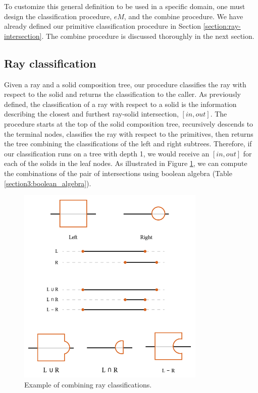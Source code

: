 \documentclass[a4paper,11pt,oneside]{article}
\begin{document}
To customize this general definition to be used in a specific domain, one must design the classification procedure, $eM$, and the combine procedure. We have already defined our primitive classification procedure in Section \ref{section:ray-intersection}. The combine procedure is discussed thoroughly in the next section.

\subsection{Ray classification}
\label{sec3.3:ray-classification}

Given a ray and a solid composition tree, our procedure classifies the ray with respect to the solid and returns the classification to the caller. As previously defined, the classification of a ray with respect to a solid is the information describing the closest and furthest ray-solid intersection, $[in, out]$. The procedure starts at the top of the solid composition tree, recursively descends to the terminal nodes, classifies the ray with respect to the primitives, then returns the tree combining the classifications of the left and right subtrees. Therefore, if our classification runs on a tree with depth 1, we would receive an $[in, out]$ for each of the solids in the leaf nodes. As illustrated in Figure \ref{sec3.3:classification}, we can compute the combinations of the pair of intersections using boolean algebra (Table \ref{section3:boolean_algebra}).

\begin{figure}[ht]
	\begin{center}
		\includegraphics[width=0.8\textwidth]{section3/3.3/ray-classifications.png}
	\end{center}
	\caption{Example of combining ray classifications.}
	\label{sec3.3:classification}
\end{figure}
\end{document}

